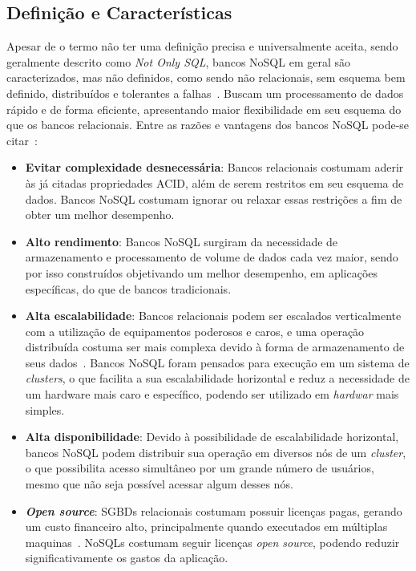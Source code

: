 \subsection{Definição e Características}
Apesar de o termo não ter uma definição precisa e universalmente aceita, sendo geralmente descrito como \emph{Not Only SQL}, bancos NoSQL em geral são caracterizados, mas não definidos, como sendo não relacionais, sem esquema bem definido, distribuídos e tolerantes a falhas~\cite{pramod}. Buscam um processamento de dados rápido e de forma eficiente, apresentando maior flexibilidade em seu esquema do que os bancos relacionais.
	Entre as razões e vantagens dos bancos NoSQL pode-se citar~\cite{chrisnosql}:
    \begin{itemize}
    \item \textbf{Evitar complexidade desnecessária}: Bancos relacionais costumam aderir às já citadas propriedades ACID, além de serem restritos em seu esquema de dados. Bancos NoSQL costumam ignorar ou relaxar essas restrições a fim de obter um melhor desempenho.
    
    \item \textbf{Alto rendimento}: Bancos NoSQL surgiram da necessidade de armazenamento e processamento de volume de dados cada vez maior, sendo por isso construídos objetivando um melhor desempenho, em aplicações específicas, do que de bancos tradicionais.
    
    \item \textbf{Alta escalabilidade}: Bancos relacionais podem ser escalados verticalmente com a utilização de equipamentos poderosos e caros, e uma operação distribuída costuma ser mais complexa devido à forma de armazenamento de seus dados~\cite{leavitt2010nosql}. Bancos NoSQL foram pensados para execução em um sistema de \emph{clusters}, o que facilita a sua escalabilidade horizontal e reduz a necessidade de um hardware mais caro e específico, podendo ser utilizado em \emph{hardwar} mais simples. 
    
    \item \textbf{Alta disponibilidade}: Devido à possibilidade de escalabilidade horizontal, bancos NoSQL podem distribuir sua operação em diversos nós de um \emph{cluster}, o que possibilita acesso simultâneo por um grande número de usuários, mesmo que não seja possível acessar algum desses nós. 
    
    \item \textbf{\emph{Open source}}: SGBDs relacionais costumam possuir licenças pagas, gerando um custo financeiro alto, principalmente quando executados em múltiplas maquinas~\cite{pramod}. NoSQLs costumam seguir licenças \emph{open source}, podendo reduzir significativamente os gastos da aplicação. 
\end{itemize}

